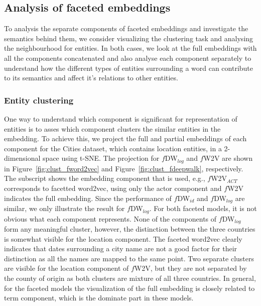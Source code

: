\subsection{Analysis of faceted embeddings}\label{subsec:exp_faceted}
To analysis the separate components of faceted embeddings and investigate the semantics behind them, we consider visualizing the clustering task and analysing the neighbourhood for entities. In both cases, we look at the full embeddings with all the components concatenated and also analyse each component separately to understand how the different types of entities surrounding a word can contribute to its semantics and affect it's relations to other entities.
\subsubsection{Entity clustering} 
One way to understand which component is significant for representation of entities is to asses which component clusters the similar entities in the embedding. To achieve this, we project the full and partial embeddings of each component for the Cities dataset, which contains location entities, in a 2-dimensional space using t-SNE. The projection for  $f$DW$_{log}$ and $f$W2V are shown in Figure~\ref{fig:clust_fword2vec} and  Figure~\ref{fig:clust_fdeepwalk}, respectively. The subscript shows the embedding component that is used, e.g., $f$W2V$_{ACT}$ corresponds to facetted word2vec, using only the actor component and $f$W2V indicates the full embedding. Since the performance of $f$DW$_{id}$ and  $f$DW$_{log}$ are similar, we only illustrate the result for $f$DW$_{log}$. For both faceted models, it is not obvious what each component represents. None of the components of  $f$DW$_{log}$ form any meaningful cluster, however, the distinction between the three countries is somewhat visible for the location component. The faceted word2vec clearly indicates that dates surrounding a city name are not a good factor for their distinction as all the names are mapped to the same point. Two separate clusters are visible for the location component of $f$W2V, but they are not separated by the county of origin as both clusters are mixture of all three countries. In general, for the faceted models the visualization of the full embedding is closely related to term component, which is the dominate part in these models.
